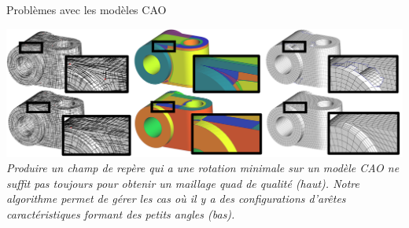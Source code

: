 \documentclass{beamer}
\begin{document}
\begin{frame}{Problèmes avec les modèles CAO}
    \begin{center}
        \includegraphics[width=0.9\linewidth]{img/cadff/teaser2}
        \small{
            \textit{Produire un champ de repère qui a une rotation minimale sur un modèle CAO ne suffit pas toujours pour obtenir un maillage quad de qualité (haut). 
            Notre algorithme permet de gérer les cas où il y a des configurations d'arêtes caractéristiques formant des petits angles (bas).}
        }
    \end{center}
\end{frame}
\end{document}
